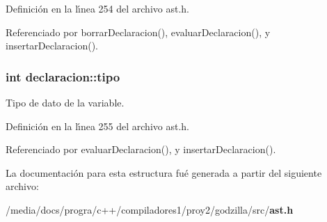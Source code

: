 Definici\'{o}n en la l\'{\i}nea 254 del archivo ast.h.

Referenciado por borrar\-Declaracion(), evaluar\-Declaracion(), y insertar\-Declaracion().
\subsubsection{\setlength{\rightskip}{0pt plus 5cm}int {\bf declaracion::tipo}}\label{structdeclaracion_o1}


Tipo de dato de la variable. 



Definici\'{o}n en la l\'{\i}nea 255 del archivo ast.h.

Referenciado por evaluar\-Declaracion(), y insertar\-Declaracion().

La documentaci\'{o}n para esta estructura fu\'{e} generada a partir del siguiente archivo:\begin{CompactItemize}
\item 
/media/docs/progra/c++/compiladores1/proy2/godzilla/src/{\bf ast.h}\end{CompactItemize}
